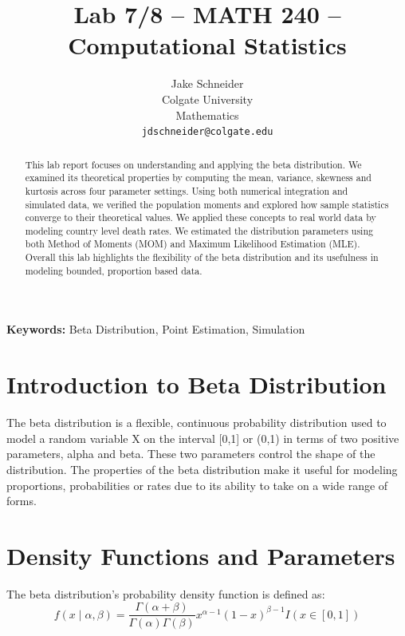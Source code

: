 \documentclass{article}\usepackage[]{graphicx}\usepackage[]{xcolor}
\begin{document}
\vspace{-1in}
\title{Lab 7/8 -- MATH 240 -- Computational Statistics}

\author{
  Jake Schneider \\
  Colgate University  \\
  Mathematics  \\
  {\tt jdschneider@colgate.edu}
}

\date{}

\maketitle

\begin{multicols}{2}
\begin{abstract}
This lab report focuses on understanding and applying the beta distribution. We examined its theoretical properties by computing the mean, variance, skewness and kurtosis across four parameter settings. Using both numerical integration and simulated data, we verified the population moments and explored how sample statistics converge to their theoretical values. We applied these concepts to real world data by modeling country level death rates. We estimated the distribution parameters using both Method of Moments (MOM) and Maximum Likelihood Estimation (MLE). Overall this lab highlights the flexibility of the beta distribution and its usefulness in modeling bounded, proportion based data. 
\end{abstract}

\noindent \textbf{Keywords:} Beta Distribution, Point Estimation, Simulation

\section{Introduction to Beta Distribution}
The beta distribution is a flexible, continuous probability distribution used to model a random variable X on the interval [0,1] or (0,1) in terms of two positive parameters, alpha and beta. These two parameters control the shape of the distribution. The properties of the beta distribution make it useful for modeling proportions, probabilities or rates due to its ability to take on a wide range of forms.

\section{Density Functions and Parameters}
The beta distribution's probability density function is defined as:
\[
f(x \mid \alpha, \beta) = \frac{\Gamma(\alpha + \beta)}{\Gamma(\alpha)\Gamma(\beta)} x^{\alpha - 1}(1 - x)^{\beta - 1}I(x \in [0,1])
\]


\end{multicols}
\end{document}
